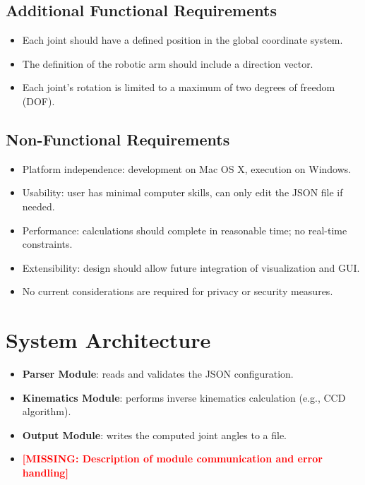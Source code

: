 \documentclass[a4paper,11pt]{article}
\newcommand{\missing}[1]{\textbf{\textcolor{red}{[MISSING: #1]}}}
\begin{document}
	\subsection{Additional Functional Requirements}
	
	\begin{itemize}
		\item Each joint should have a defined position in the global coordinate system.
		\item The definition of the robotic arm should include a direction vector.
		\item Each joint's rotation is limited to a maximum of two degrees of freedom (DOF).
	\end{itemize}
	
	\subsection{Non-Functional Requirements}
	
	\begin{itemize}
		\item Platform independence: development on Mac OS X, execution on Windows.
		\item Usability: user has minimal computer skills, can only edit the JSON file if needed.
		\item Performance: calculations should complete in reasonable time; no real-time constraints.
		\item Extensibility: design should allow future integration of visualization and GUI.
		\item No current considerations are required for privacy or security measures.
	\end{itemize}
	
	\section{System Architecture}
	
	\begin{itemize}
		\item \textbf{Parser Module}: reads and validates the JSON configuration.
		\item \textbf{Kinematics Module}: performs inverse kinematics calculation (e.g., CCD algorithm).
		\item \textbf{Output Module}: writes the computed joint angles to a file.
		\item \missing{Description of module communication and error handling}
	\end{itemize}
	
\end{document}
